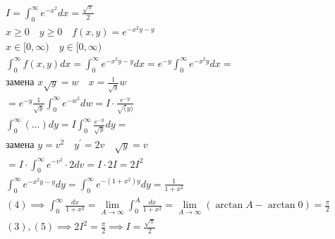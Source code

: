 \documentclass[main]{subfiles}
\begin{document}
     \begin{example}
          \begin{gather*}
               I = \int^\infty_0 e^{-x^2} dx = \frac{\sqrt{\pi}}{2} \\
               x \geq 0 \quad y \geq 0 \quad f(x,y) = e^{-x^2y - y} \tag{1} \\
               x \in [0, \infty) \quad y \in [0, \infty) \\
                \int^\infty_0 f(x,y) dx = \int^\infty_0 e^{-x^2y - y} dx = 
               e^{-y} \int^\infty_0 e^{-x^2y} dx = \\
               \text{замена } x\sqrt{y} = w \quad x = \frac{1}{\sqrt{y}}w \\
                = e^{-y} \frac{1}{\sqrt{y}} \int^\infty_0 e^{-w^2} dw = I \cdot \frac {e^{-y}}{\sqrt(y)} \tag{2} \\
               \int^\infty_0 (\ldots)dy = I \int^\infty_0 \frac{e^{-y}}{\sqrt{y}}dy = \\
               \text{замена } y = v^2 \quad y^\prime = 2v \quad \sqrt{y} = v \\
                =I \cdot \int^\infty_0 e^{-v^2} \cdot 2dv = I \cdot 2I = 2I^2 \tag{3} \\
                \int^\infty_0 e^{-x^2y -y}dy = \int^\infty_0 e^{-(1+x^2)y} dy = \frac{1}{1+x^2} \tag{4} \\
                 (4) \implies \int^\infty_0 \frac{dx}{1+x^2} = \underset{A \to \infty}{\lim} \int^A_0 \frac{dx}{1+x^2} = \underset{A \to \infty}{\lim} (\arctan A - \arctan 0) = \frac{\pi}{2} \tag{5} \\
                 (3),(5) \implies 2I^2 = \frac{\pi}{2} \implies I = \frac{\sqrt{\pi}}{2}
          \end{gather*}
     \end{example}
    
\end{document}
